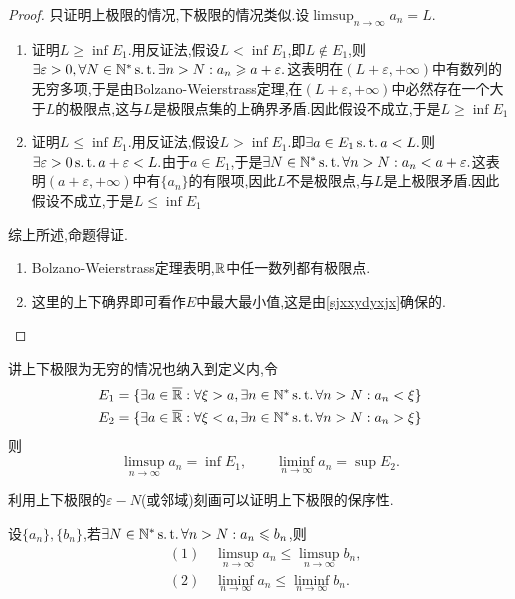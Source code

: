 \begin{proof}
    只证明上极限的情况,下极限的情况类似.设$\limsup_{n\to\infty}a_n=L.$
    \begin{enumerate}
        \item 证明$L\geqslant\inf E_1.$用反证法,假设$L<\inf E_1$,即$L\notin E_1$,则$\exists\varepsilon>0,\forall N\in\mathbb{N}^*\operatorname{s.t.}\exists n>N:a_n\geqslant a+\varepsilon.$这表明在$(L+\varepsilon,+\infty)$中有数列的无穷多项,于是由Bolzano-Weierstrass定理,在$(L+\varepsilon,+\infty)$中必然存在一个大于$L$的极限点,这与$L$是极限点集的上确界矛盾.因此假设不成立,于是$L\geqslant \inf E_1$
        \item 证明$L\leqslant\inf E_1.$用反证法,假设$L>\inf E_1$.即$\exists a\in E_1\operatorname{s.t.} a<L.$则$\exists\varepsilon >0\operatorname{s.t.} a+\varepsilon <L.$由于$a\in E_1$,于是$\exists N\in\mathbb{N}^*\operatorname{s.t.}\forall n>N:a_n<a+\varepsilon.$这表明$(a+\varepsilon,+\infty)$中有$\{a_n\}$的有限项,因此$L$不是极限点,与$L$是上极限矛盾.因此假设不成立,于是$L\leqslant \inf E_1$
    \end{enumerate}
    综上所述,命题得证.
\begin{note}
    \begin{enumerate}
    \item Bolzano-Weierstrass定理表明,$\mathbb{R}$中任一数列都有极限点.
    \item 这里的上下确界即可看作$E$中最大最小值,这是由\ref{sjxxydyxjx}确保的.
    \end{enumerate}
\end{note}
\end{proof}

\begin{remark}
    讲上下极限为无穷的情况也纳入到定义内,令
    \begin{align*}
        E_1=\{\exists a\in \overline{\mathbb{R}}:\forall \xi >a,\exists n\in\mathbb{N}^*\operatorname{s.t.}\forall n>N:a_n<\xi\}\\
        E_2=\{\exists a\in \overline{\mathbb{R}}:\forall \xi <a,\exists n\in\mathbb{N}^*\operatorname{s.t.}\forall n>N:a_n>\xi\}
    \end{align*}
    则
    \[\limsup_{n\to\infty}a_n=\inf E_1,\qquad\liminf_{n\to\infty}a_n=\sup E_2.\]
\end{remark}

利用上下极限的$\varepsilon-N$(或邻域)刻画可以证明上下极限的保序性.

\begin{proposition}[上极限和下极限的保序性]
    设$\{a_n\},\{b_n\}$,若$\exists N\in\mathbb{N}^*\operatorname{s.t.} \forall n>N:a_n\leqslant b_n$,则
        \begin{align*}
            &(1)\quad\limsup_{n\to\infty}a_n\leqslant\limsup_{n\to\infty}b_n,\\
            &(2)\quad\liminf_{n\to\infty}a_n\leqslant\liminf_{n\to\infty}b_n.
        \end{align*}
\end{proposition}

